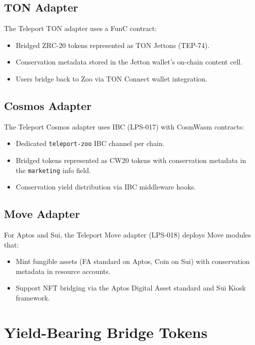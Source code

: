 \documentclass[11pt,letterpaper]{article}
\begin{document}
\subsection{TON Adapter}

The Teleport TON adapter uses a FunC contract:

\begin{itemize}
    \item Bridged ZRC-20 tokens represented as TON Jettons (TEP-74).
    \item Conservation metadata stored in the Jetton wallet's on-chain content cell.
    \item Users bridge back to Zoo via TON Connect wallet integration.
\end{itemize}

\subsection{Cosmos Adapter}

The Teleport Cosmos adapter uses IBC (LPS-017) with CosmWasm contracts:

\begin{itemize}
    \item Dedicated \texttt{teleport-zoo} IBC channel per chain.
    \item Bridged tokens represented as CW20 tokens with conservation metadata in the \texttt{marketing} info field.
    \item Conservation yield distribution via IBC middleware hooks.
\end{itemize}

\subsection{Move Adapter}

For Aptos and Sui, the Teleport Move adapter (LPS-018) deploys Move modules that:

\begin{itemize}
    \item Mint fungible assets (FA standard on Aptos, Coin on Sui) with conservation metadata in resource accounts.
    \item Support NFT bridging via the Aptos Digital Asset standard and Sui Kiosk framework.
\end{itemize}

\section{Yield-Bearing Bridge Tokens}
\label{sec:yield}
\end{document}
